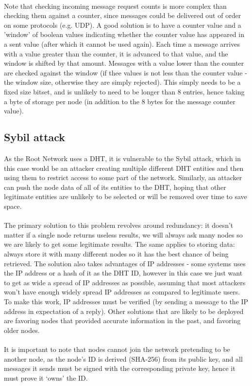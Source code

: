 \documentclass{article}
\begin{document}
\paragraph{}
Note that checking incoming message request counts is more complex than checking them against a counter, since messages could be delivered out of order on some protocols (e.g. UDP). A good solution is to have a counter value and a 'window' of boolean values indicating whether the counter value has appeared in a sent value (after which it cannot be used again). Each time a message arrives with a value greater than the counter, it is advanced to that value, and the window is shifted by that amount. Messages with a value lower than the counter are checked against the window (if thee values is not less than the counter value - the window size, otherwise they are simply rejected). This simply needs to be a fixed size bitset, and is unlikely to need to be longer than 8 entries, hence taking a byte of storage per node (in addition to the 8 bytes for the message counter value).

\subsection{Sybil attack}

\paragraph{}
As the Root Network uses a DHT, it is vulnerable to the Sybil attack, which in this case would be an attacker creating multiple different DHT entities and then using them to restrict access to some part of the network. Similarly, an attacker can push the node data of all of its entities to the DHT, hoping that other legitimate entities are unlikely to be selected or will be removed over time to save space.

\paragraph{}
The primary solution to this problem revolves around redundancy: it doesn't matter if a single node returns useless results, we will always ask many nodes so we are likely to get some legitimate results. The same applies to storing data: always store it with many different nodes so it has the best chance of being retrieved. The solution also takes advantages of IP addresses - some systems uses the IP address or a hash of it as the DHT ID, however in this case we just want to get as wide a spread of IP addresses as possible, assuming that most attackers won't have enough widely spread IP addresses as compared to legitimate users. To make this work, IP addresses must be verified (by sending a message to the IP address in expectation of a reply). Other solutions that are likely to be deployed are favoring nodes that provided accurate information in the past, and favoring older nodes.

\paragraph{}
It is important to note that nodes cannot join the network pretending to be another node, as the node's ID is derived (SHA-256) from its public key, and all messages it sends must be signed with the corresponding private key, hence it must prove it `owns' the ID.
\end{document}
